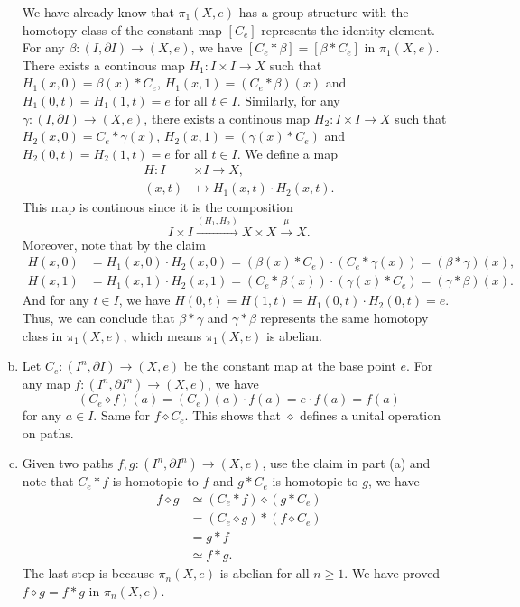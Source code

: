 \documentclass[a4paper, 12pt]{article}
\begin{document}
\begin{solution}
\begin{enumerate}[(a)]
We have already know that \(\pi_1(X,e)\) has a group structure with the homotopy class of the constant map \([C_e]\) represents the identity element. For any \(\beta:(I,\partial I)\rightarrow (X,e)\), we have 
\([C_e*\beta]=[\beta*C_e]\) in \(\pi_1(X,e)\). There exists a continous map 
\(H_1:I\times I\rightarrow X\) such that \(H_1(x,0)=\beta(x)*C_e\), \(H_1(x,1)=(C_e*\beta)(x)\) and \(H_1(0,t)=H_1(1,t)=e\) for all \(t\in I\). Similarly, for any \(\gamma:(I,\partial I)\rightarrow (X,e)\), there exists a continous map 
\(H_2:I\times I\rightarrow X\) such that \(H_2(x,0)=C_e*\gamma(x)\), \(H_2(x,1)=(\gamma(x)*C_e)\) and \(H_2(0,t)=H_2(1,t)=e\) for all \(t\in I\). We define a map 
\begin{align*}
	H:I&\times I\rightarrow X,\\
	(x,t)&\mapsto H_1(x,t)\cdot H_2(x,t).
\end{align*}
This map is continous since it is the composition 
\[I\times I\xrightarrow{(H_1,H_2)}X\times X\xrightarrow{\mu} X.\]
Moreover, note that by the claim 
\begin{align*}
	H(x,0)&=H_1(x,0)\cdot H_2(x,0)=(\beta(x)*C_e)\cdot(C_e*\gamma(x))=(\beta*\gamma)(x),\\ 
	H(x,1)&=H_1(x,1)\cdot H_2(x,1)=(C_e*\beta(x))\cdot(\gamma(x)*C_e)=(\gamma*\beta)(x).
\end{align*}
And for any \(t\in I\), we have \(H(0,t)=H(1,t)=H_1(0,t)\cdot H_2(0,t)=e\). Thus, we can conclude that \(\beta*\gamma\) and \(\gamma*\beta\) represents the same homotopy class in \(\pi_1(X,e)\), which means \(\pi_1(X,e)\) is abelian.
\item Let \(C_e:(I^n,\partial I)\rightarrow (X,e)\) be the constant map at the base point \(e\). For any map \(f:(I^n,\partial I^n)\rightarrow (X,e)\), we have 
\[(C_e\diamond f)(a)=(C_e)(a)\cdot f(a)=e\cdot f(a)=f(a)\]
for any \(a\in I\). Same for \(f\diamond C_e\). This shows that \(\diamond\) defines a unital operation on paths. 
\item Given two paths \(f,g:(I^n,\partial I^n)\rightarrow (X,e)\), use the claim in part (a) and note that \(C_e*f\) is homotopic to \(f\) and \(g*C_e\) is homotopic to \(g\), we have 
\begin{align*}
f\diamond g &\simeq (C_e*f)\diamond (g*C_e)\\ 
            &=(C_e\diamond g)*(f\diamond C_e)\\ 
			&=g*f\\ 
			&\simeq f*g.
\end{align*}
The last step is because \(\pi_n(X,e)\) is abelian for all \(n\geq 1\). We have proved \(f\diamond g=f*g\) in \(\pi_n(X,e)\).
\end{enumerate}
\end{solution}
\end{document}
